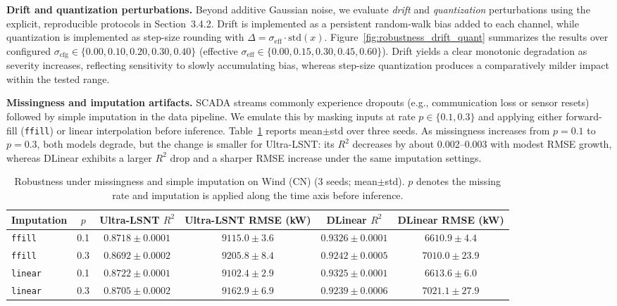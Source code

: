 \documentclass[review,3p,times]{elsarticle}
\begin{document}
\noindent\textbf{Drift and quantization perturbations.}
Beyond additive Gaussian noise, we evaluate \emph{drift} and \emph{quantization} perturbations using the explicit, reproducible protocols in Section~3.4.2. Drift is implemented as a persistent random-walk bias added to each channel, while quantization is implemented as step-size rounding with $\Delta=\sigma_{\mathrm{eff}}\cdot \mathrm{std}(x)$. Figure~\ref{fig:robustness_drift_quant} summarizes the results over configured $\sigma_{\mathrm{cfg}}\in\{0.00,0.10,0.20,0.30,0.40\}$ (effective $\sigma_{\mathrm{eff}}\in\{0.00,0.15,0.30,0.45,0.60\}$). Drift yields a clear monotonic degradation as severity increases, reflecting sensitivity to slowly accumulating bias, whereas step-size quantization produces a comparatively milder impact within the tested range.


\noindent\textbf{Missingness and imputation artifacts.}
SCADA streams commonly experience dropouts (e.g., communication loss or sensor resets) followed by simple imputation in the data pipeline. We emulate this by masking inputs at rate $p\in\{0.1,0.3\}$ and applying either forward-fill (\texttt{ffill}) or linear interpolation before inference. Table~\ref{tab:robust_missingness} reports mean$\pm$std over three seeds. As missingness increases from $p=0.1$ to $p=0.3$, both models degrade, but the change is smaller for Ultra-LSNT: its $R^2$ decreases by about 0.002--0.003 with modest RMSE growth, whereas DLinear exhibits a larger $R^2$ drop and a sharper RMSE increase under the same imputation settings.

\begin{table}[t]
\centering
\caption{Robustness under missingness and simple imputation on Wind (CN) (3 seeds; mean$\pm$std). $p$ denotes the missing rate and imputation is applied along the time axis before inference.}
\label{tab:robust_missingness}
\begin{tabular}{lccccc}
\toprule
Imputation & $p$ & Ultra-LSNT $R^2$ & Ultra-LSNT RMSE (kW) & DLinear $R^2$ & DLinear RMSE (kW) \\
\midrule
\texttt{ffill} & 0.1 & $0.8718\pm0.0001$ & $9115.0\pm3.6$ & $0.9326\pm0.0001$ & $6610.9\pm4.4$ \\
\texttt{ffill} & 0.3 & $0.8692\pm0.0002$ & $9205.8\pm8.4$ & $0.9242\pm0.0005$ & $7010.0\pm23.9$ \\
\texttt{linear} & 0.1 & $0.8722\pm0.0001$ & $9102.4\pm2.9$ & $0.9325\pm0.0001$ & $6613.6\pm6.0$ \\
\texttt{linear} & 0.3 & $0.8705\pm0.0002$ & $9162.9\pm6.9$ & $0.9239\pm0.0006$ & $7021.1\pm27.9$ \\
\bottomrule
\end{tabular}
\end{table}
\end{document}
